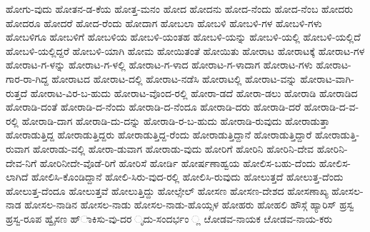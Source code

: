 ಹೋಗು-ವುದು
ಹೋತನ-ಡ-ಕೆಯ
ಹೋತ್ತ-ಮನಂ
ಹೋದ
ಹೋದನು
ಹೋದ-ನೆಂದು
ಹೋದ-ನೆಂಬ
ಹೋದರು
ಹೋದರೂ
ಹೋದರೆ
ಹೋದ-ರೆಂದು
ಹೋದಾಗ
ಹೋಬಲಾ
ಹೋಬಳಿ
ಹೋಬಳಿ-ಗಳ
ಹೋಬಳಿ-ಗಳು
ಹೋಬಳಿಗೂ
ಹೋಬಳಿಗೆ
ಹೋಬಳಿಯ
ಹೋಬಳಿ-ಯಂತಹ
ಹೋಬಳಿ-ಯನ್ನು
ಹೋಬಳಿ-ಯಲ್ಲಿ
ಹೋಬಳಿ-ಯಲ್ಲಿದೆ
ಹೋಬಳಿ-ಯಲ್ಲಿದ್ದರೆ
ಹೋಬಳಿ-ಯಾಗಿ
ಹೋಮ
ಹೋಯಿತಂತೆ
ಹೋಯಿತು
ಹೋರಾಟ
ಹೋರಾಟಕ್ಕೆ
ಹೋರಾಟ-ಗಳ
ಹೋರಾಟ-ಗ-ಳನ್ನು
ಹೋರಾಟ-ಗ-ಳಲ್ಲಿ
ಹೋರಾಟ-ಗ-ಳಾದ
ಹೋರಾಟ-ಗ-ಳಾದಾಗ
ಹೋರಾಟ-ಗಳು
ಹೋರಾಟ-ಗಾರ-ರಾ-ಗಿದ್ದ
ಹೋರಾಟದ
ಹೋರಾಟ-ದಲ್ಲಿ
ಹೋರಾಟ-ನಡೆಸಿ
ಹೋರಾಟಲ್ಲಿ
ಹೋರಾಟ-ವನ್ನು
ಹೋರಾಟ-ವಾಗಿ-ರುತ್ತದೆ
ಹೋರಾಟ-ವಿರ-ಬ-ಹುದು
ಹೋರಾಟ-ವೊಂದ-ರಲ್ಲಿ
ಹೋರಾ-ಡದೆ
ಹೋರಾ-ಡಲು
ಹೋರಾಡಿ
ಹೋರಾಡಿದ
ಹೋರಾಡಿ-ದಂತೆ
ಹೋರಾಡಿ-ದ-ನೆಂದು
ಹೋರಾಡಿ-ದ-ನೆಂದೂ
ಹೋರಾಡಿ-ದರು
ಹೋರಾಡಿ-ದರೆ
ಹೋರಾಡಿ-ದ-ವ-ರಲ್ಲಿ
ಹೋರಾಡಿ-ದಾಗ
ಹೋರಾಡಿ-ದು-ದನ್ನು
ಹೋರಾಡಿ-ರ-ಬ-ಹುದು
ಹೋರಾಡಿ-ರುವುದು
ಹೋರಾಡುತ್ತಾ
ಹೋರಾಡುತ್ತಿದ್ದ
ಹೋರಾಡುತ್ತಿದ್ದರು
ಹೋರಾಡುತ್ತಿದ್ದ-ರೆಂದು
ಹೋರಾಡುತ್ತಿದ್ದಾನೆ
ಹೋರಾಡುತ್ತಿದ್ದಾರೆ
ಹೋರಾಡುತ್ತಿ-ರುವಾಗ
ಹೋರಾಡು-ವಲ್ಲಿ
ಹೋರಾ-ಡುವಾಗ
ಹೋರಾಡು-ವುದು
ಹೋರಿಗೆ
ಹೋರಿನಿ
ಹೋರಿನಿ-ದೇವ
ಹೋರಿನಿ-ದೇವ-ನಿಗೆ
ಹೋರಿನೀದೇ-ವೊಡೆ-ರಿಗೆ
ಹೋರಿಸೆ
ಹೋರ್ಡಿ
ಹೋರ್ಷಣಾಹ್ವಯ
ಹೋಲಿಸ-ಬಹು-ದೆಂದು
ಹೋಲಿಸ-ಲಾಗಿದೆ
ಹೋಲಿಸಿ-ಕೊಂಡಿದ್ದಾನೆ
ಹೋಲಿ-ಸಿರು-ವುದ-ರಲ್ಲಿ
ಹೋಲಿಸಿ-ರುವುದು
ಹೋಲುತ್ತದೆ
ಹೋಲುತ್ತ-ದೆಂದು
ಹೋಲುತ್ತ-ದೆಂದೂ
ಹೋಲುತ್ತವೆ
ಹೋಲುತ್ತಿದ್ದು
ಹೋಲ್ಸೇಲ್
ಹೋಸಣ
ಹೋಸಣ-ದೇಶದ
ಹೋಸಣಾಖ್ಯ
ಹೋಸಲ-ನಾಡ
ಹೋಸಲ-ನಾಡಿನ
ಹೋಸಲ-ನಾಡು
ಹೋಸಲ-ನಾಡು-ಹೊಯ್ಸಳ
ಹೋಹರು
ಹೋಹಲಿ
ಹೌಸ್ಗೆ
ಹ್ಯಾರಿಸ್
ಹ್ರಸ್ವ
ಹ್ರಸ್ವ-ರೂಪ
ಹ್ವೈಸಣ
ಹ್ಾಕಿಸು-ವು-ದರ
ೃದು-ಸಂದರ್ಭಂ
್ಲ
ೞೋಡವ-ನಾಯಕ
ೞೋಡವ-ನಾಯ-ಕರು
